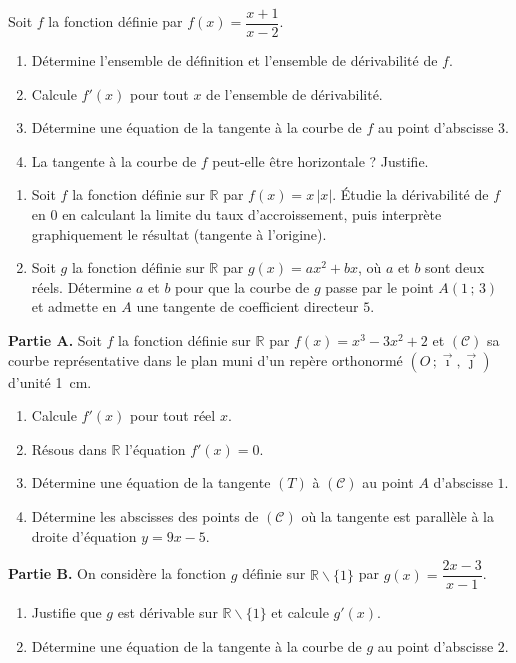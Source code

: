 \documentclass[11pt]{article}
\newcounter{popsec}
\newcounter{popsub}
\newcommand{\courssub}[1]{%
  \stepcounter{popsub}%
  \par\vspace{9pt}\noindent{\popxbold\fontsize{11.5}{13}\selectfont\color{popink}{\color{poporange}\thepopsec.\thepopsub}\hspace{6pt}#1}\par\nopagebreak\vspace{4pt}
}
\def\setminus{\mathbin{\backslash}}\let\smallsetminus\setminus
\begin{document}
\begin{exercice}
Soit $f$ la fonction définie par $f(x)=\dfrac{x+1}{x-2}$.
\begin{enumerate}
\item Détermine l'ensemble de définition et l'ensemble de dérivabilité de $f$.
\item Calcule $f'(x)$ pour tout $x$ de l'ensemble de dérivabilité.
\item Détermine une équation de la tangente à la courbe de $f$ au point d'abscisse $3$.
\item La tangente à la courbe de $f$ peut-elle être horizontale ? Justifie.
\end{enumerate}
\end{exercice}

\begin{exercice}
\begin{enumerate}
\item Soit $f$ la fonction définie sur $\mathbb{R}$ par $f(x)=x\,|x|$. Étudie la dérivabilité de $f$ en $0$ en calculant la limite du taux d'accroissement, puis interprète graphiquement le résultat (tangente à l'origine).
\item Soit $g$ la fonction définie sur $\mathbb{R}$ par $g(x)=ax^2+bx$, où $a$ et $b$ sont deux réels. Détermine $a$ et $b$ pour que la courbe de $g$ passe par le point $A(1\,;\,3)$ et admette en $A$ une tangente de coefficient directeur $5$.
\end{enumerate}
\end{exercice}

\courssub{Je me prépare au Probatoire}

\begin{exercice}
\textbf{Partie A.} Soit $f$ la fonction définie sur $\mathbb{R}$ par $f(x)=x^3-3x^2+2$ et $(\mathcal{C})$ sa courbe représentative dans le plan muni d'un repère orthonormé $(O\,;\vec{\imath},\vec{\jmath})$ d'unité \SI{1}{cm}.
\begin{enumerate}
\item Calcule $f'(x)$ pour tout réel $x$.
\item Résous dans $\mathbb{R}$ l'équation $f'(x)=0$.
\item Détermine une équation de la tangente $(T)$ à $(\mathcal{C})$ au point $A$ d'abscisse $1$.
\item Détermine les abscisses des points de $(\mathcal{C})$ où la tangente est parallèle à la droite d'équation $y=9x-5$.
\end{enumerate}
\textbf{Partie B.} On considère la fonction $g$ définie sur $\mathbb{R}\setminus\{1\}$ par $g(x)=\dfrac{2x-3}{x-1}$.
\begin{enumerate}
\item Justifie que $g$ est dérivable sur $\mathbb{R}\setminus\{1\}$ et calcule $g'(x)$.
\item Détermine une équation de la tangente à la courbe de $g$ au point d'abscisse $2$.
\end{enumerate}
\end{exercice}
\end{document}
